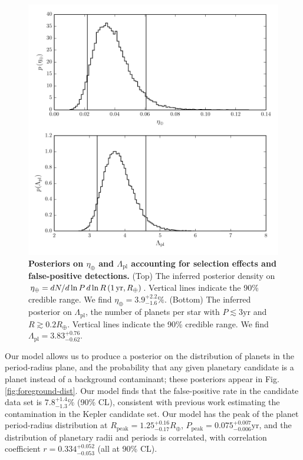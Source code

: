 \documentclass[12pt]{article}
\newcommand{\etaearth}{\eta_\oplus}
\newcommand{\Rpeak}{R_\mathrm{peak}}
\newcommand{\REarth}{R_\oplus}
\newcommand{\Rpl}{\Lambda_\mathrm{pl}}
\newcommand{\earange}{3.9_{-1.6}^{+2.2}\%}
\newcommand{\rplrange}{3.83_{-0.62}^{+0.76}}
\newcommand{\rpeakrange}{1.25_{-0.17}^{+0.16}}
\newcommand{\corrcoeffrange}{0.334_{-0.053}^{+0.052}}
\newcommand{\fposrange}{7.8_{-1.3}^{+1.4}\%}
\newcommand{\ppeakrange}{0.075_{-0.006}^{+0.007}}
\begin{document}
\begin{figure}
  \includegraphics[width=\columnwidth]{pars}
  \caption{\label{fig:eta-earth} \textbf{Posteriors on $\etaearth$ and
      $\Rpl$ accounting for selection effects and false-positive
      detections.}  (Top) The inferred posterior density on $\etaearth
    = dN/d\ln P \, d\ln R \left( 1\, \textnormal{yr}, R_\oplus
    \right)$.  Vertical lines indicate the 90\% credible range.  We
    find $\etaearth = \earange$.  (Bottom) The inferred posterior on
    $\Rpl$, the number of planets per star with $P \lesssim 3
    \mathrm{yr}$ and $R \gtrsim 0.2 \REarth$.  Vertical lines indicate
    the 90\% credible range.  We find $\Rpl = \rplrange$.}
\end{figure}

Our model allows us to produce a posterior on the distribution of
planets in the period-radius plane, and the probability that any given
planetary candidate is a planet instead of a background contaminant;
these posteriors appear in Fig. \ref{fig:foreground-dist}.  Our model
finds that the false-positive rate in the candidate data set is
$\fposrange$ (90\% CL), consistent with previous
work\cite{Fressin2013} estimating the contamination in the Kepler
candidate set.  Our model has the peak of the planet period-radius
distribution at $\Rpeak = \rpeakrange \REarth$, $P_\mathrm{peak} =
\ppeakrange \mathrm{yr}$, and the distribution of planetary radii and
periods is correlated, with correlation coefficient $r =
\corrcoeffrange$ (all at 90\% CL).
\end{document}
